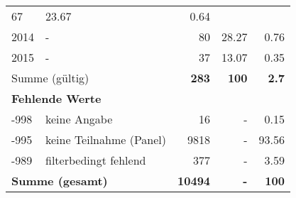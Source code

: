 \begin{longtable}{lXrrr}
       \num{67} &
       \num[round-mode=places,round-precision=2]{23.67} &
         \num[round-mode=places,round-precision=2]{0.64} \\

     2014 &
     \multicolumn{1}{X}{ -  } &


       \num{80} &
       \num[round-mode=places,round-precision=2]{28.27} &
         \num[round-mode=places,round-precision=2]{0.76} \\

     2015 &
     \multicolumn{1}{X}{ -  } &


       \num{37} &
       \num[round-mode=places,round-precision=2]{13.07} &
         \num[round-mode=places,round-precision=2]{0.35} \\
     \midrule
     \multicolumn{2}{l}{Summe (gültig)} &
       \textbf{\num{283}} &
     \textbf{\num{100}} &
       \textbf{\num[round-mode=places,round-precision=2]{2.7}} \\
     \multicolumn{5}{l}{\textbf{Fehlende Werte}}\\
       -998 &
       keine Angabe &
         \num{16} &
        - &
         \num[round-mode=places,round-precision=2]{0.15} \\
       -995 &
       keine Teilnahme (Panel) &
         \num{9818} &
        - &
         \num[round-mode=places,round-precision=2]{93.56} \\
       -989 &
       filterbedingt fehlend &
         \num{377} &
        - &
         \num[round-mode=places,round-precision=2]{3.59} \\
     \midrule
     \multicolumn{2}{l}{\textbf{Summe (gesamt)}} &
          \textbf{\num{10494}} &
        \textbf{-} &
        \textbf{\num{100}} \\
     \bottomrule
     \end{longtable}
     
